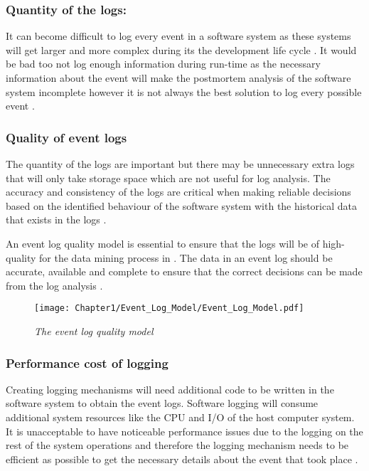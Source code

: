 \subsubsection{Quantity of the logs:} 
It can become difficult to log every event in a software system as these systems will get larger and more complex during its the development life cycle \cite{Stojanov2017}. It would be bad too not log enough information during run-time as the necessary information about the event will make the postmortem analysis of the software system incomplete however it is not always the best solution to log every possible event \cite{Zhu2015, Jans2012}.

\subsubsection{Quality of event logs} 
The quantity of the logs are important but there may be unnecessary extra logs that will only take storage space which are not useful for log analysis. The accuracy and consistency of the logs are critical when making reliable decisions based on the identified behaviour of the software system with the historical data that exists in the logs \cite{Stojanov2017,Kherbouche2017}.\par An event log quality model is essential to ensure that the logs will be of high-quality for the data mining process in . The data in an event log should be accurate, available and complete to ensure that the correct decisions can be made from the log analysis \cite{Kherbouche2017, VanDerAalst2011}.

\begin{figure}[!htb] %
	\centering %
	\texttt{[image: Chapter1/Event\_Log\_Model/Event\_Log\_Model.pdf]}
	\caption[The event log quality model]
	{\textit{The event log quality model \cite{Kherbouche2017}}} \label{fig:EventQModel}
\end{figure}

\subsubsection{Performance cost of logging} 
Creating logging mechanisms will need additional code to be written in the software system to obtain the event logs. Software logging will consume additional system resources like the CPU and I/O of the host computer system. It is unacceptable to have noticeable performance issues due to the logging on the rest of the system operations and therefore the logging mechanism needs to be efficient as possible to get the necessary details about the event that took place \cite{Zhu2015,Zhu2019}. 

